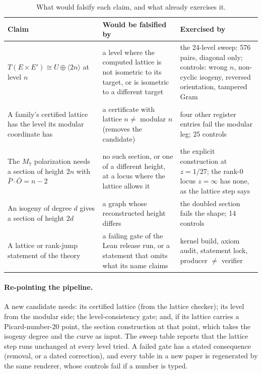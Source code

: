 \documentclass[11pt,a4paper]{article}
\theoremstyle{remark}
\begin{document}
\begin{table}[h]
\centering\footnotesize\renewcommand{\arraystretch}{1.35}
\begin{tabular}{p{4.2cm}p{4.4cm}p{5.4cm}}
\toprule
Claim & Would be falsified by & Exercised by \\
\midrule
$T(E\times E')\cong U\oplus\langle2n\rangle$ at level $n$ & a level where the computed lattice is not isometric to its target, or is isometric to a different target & the 24-level sweep: 576 pairs, diagonal only; controls: wrong $n$, non-cyclic isogeny, reversed orientation, tampered Gram \\
A family's certified lattice has the level its modular coordinate has & a certificate with lattice $n\ne$ modular $n$ (removes the candidate) & four other register entries fail the modular leg; 25 controls \\
The $M_7$ polarization needs a section of height $2n$ with $\bar P\cdot\bar O=n-2$ & no such section, or one of a different height, at a locus where the lattice allows it & the explicit construction at $z=1/27$; the rank-$0$ locus $z=\infty$ has none, as the lattice step says \\
An isogeny of degree $d$ gives a section of height $2d$ & a graph whose reconstructed height differs & the doubled section fails the shape; 14 controls \\
A lattice or rank-jump statement of the theory & a failing gate of the Lean release run, or a statement that omits what its name claims & kernel build, axiom audit, statement lock, producer $\ne$ verifier \\
\bottomrule
\end{tabular}
\caption{What would falsify each claim, and what already exercises it.}\label{tab:falsify}
\end{table}

\paragraph{Re-pointing the pipeline.} A new candidate needs: its certified lattice (from the lattice checker); its level from the
modular side; the level-consistency gate; and, if its lattice carries a Picard-number-$20$ point, the section construction at that
point, which takes the isogeny degree and the curve as input. The sweep table reports that the lattice step runs unchanged at every level tried.
A failed gate has a stated consequence (removal, or a dated correction), and every table in a new paper is regenerated by the same
renderer, whose controls fail if a number is typed.
\end{document}
